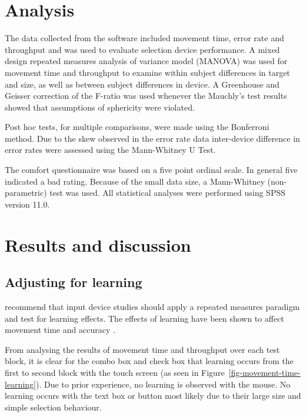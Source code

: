 \documentclass{elsart}
\begin{document}
\section{Analysis}
\label{sec-analysis}

The data collected from the software included movement time, error rate
and throughput and was used to evaluate selection device performance. A
mixed design repeated measures analysis of variance model (MANOVA) was
used for movement time and throughput to examine within subject
differences in target and size, as well as between subject differences
in device. A Greenhouse and Geisser correction of the F-ratio was used
whenever the Mauchly's test results showed that assumptions of
sphericity were violated.

Post hoc tests, for multiple comparisons, were made using the Bonferroni
method. Due to the skew observed in the error rate data inter-device
difference in error rates were assessed using the Mann-Whitney U Test.

The comfort questionnaire was based on a five point ordinal scale. In
general five indicated a bad rating. Because of the small data size, a
Mann-Whitney (non-parametric) test was used. All statistical analyses
were performed using SPSS version 11.0.

\section{Results and discussion}
\label{sec-results}

\subsection{Adjusting for learning}
\label{sec-results-learning}

\citet{Doug-SA-1999-CHI} recommend that input device studies should
apply a repeated measures paradigm and test for learning effects. The
effects of learning have been shown to affect movement time and accuracy
\citep{Doug-SA-1999-CHI}.

From analysing the results of movement time and throughput over each
test block, it is clear for the combo box and check box that learning
occurs from the first to second block with the touch screen (as seen in
Figure~\ref{fig-movement-time-learning}). Due to prior experience, no
learning is observed with the mouse. No learning occurs with the text
box or button most likely due to their large size and simple selection
behaviour.
\end{document}

